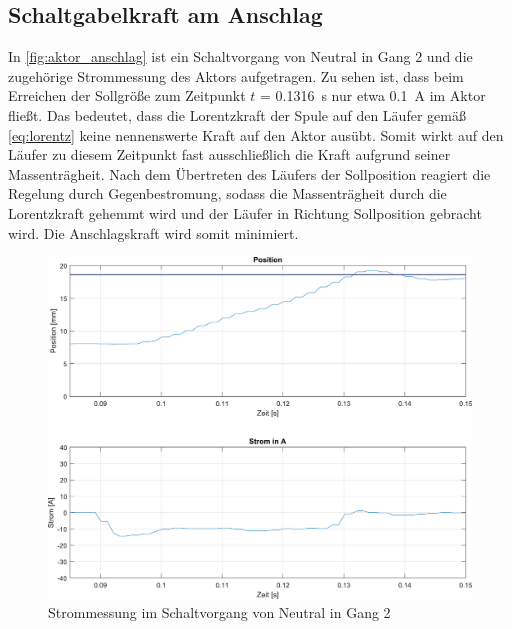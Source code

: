 \subsection{Schaltgabelkraft am Anschlag}\label{schaltgabelkraft}
In \autoref{fig:aktor_anschlag} ist ein Schaltvorgang von Neutral in Gang 2 und die zugehörige Strommessung des Aktors aufgetragen. Zu sehen ist, dass beim Erreichen der Sollgröße zum Zeitpunkt $t$ = \SI{0,1316}{s} nur etwa \SI{0,1}{A} im Aktor fließt. Das bedeutet, dass die Lorentzkraft der Spule auf den Läufer gemäß \autoref{eq:lorentz} keine nennenswerte Kraft auf den Aktor ausübt. Somit wirkt auf den Läufer zu diesem Zeitpunkt fast ausschließlich die Kraft aufgrund seiner Massenträgheit. Nach dem Übertreten des Läufers der Sollposition reagiert die Regelung durch Gegenbestromung, sodass die Massenträgheit durch die Lorentzkraft gehemmt wird und der Läufer in Richtung Sollposition gebracht wird. Die Anschlagskraft wird somit minimiert.

\begin{figure} [h]
	\centering
	\includegraphics[width=1\linewidth]{Bilder/aktor_anschlag2}
	\caption{Strommessung im Schaltvorgang von Neutral in Gang 2}
	\label{fig:aktor_anschlag}
\end{figure}